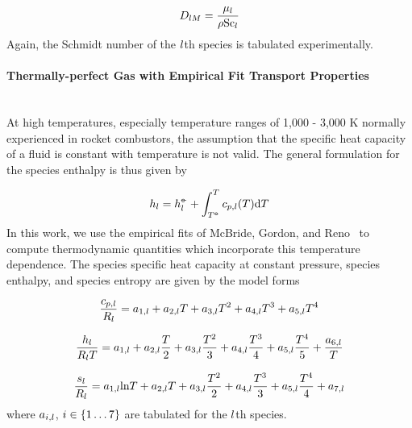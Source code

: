 \begin{equation}\label{eq:cpgMassDiffSpec}
	D_{l M} = \frac{\mu_{l}}{\rho \text{Sc}_{l}}
\end{equation}
Again, the Schmidt number of the $l$th species is tabulated experimentally.

\paragraph*{Thermally-perfect Gas with Empirical Fit Transport Properties}\mbox{}\\

At high temperatures, especially temperature ranges of 1,000 - 3,000 K normally experienced in rocket combustors, the assumption that the specific heat capacity of a fluid is constant with temperature is not valid. The general formulation for the species enthalpy is thus given by

\begin{eqnarray}
	h_{l} = h^{\circ\kern-0.47em-}_{l} + \int_{T^{\circ\kern-0.47em-}}^{T} c_{p,l}(T) \text{d}T
\end{eqnarray}
In this work, we use the empirical fits of McBride, Gordon, and Reno~\cite{McBride1993} to compute thermodynamic quantities which incorporate this temperature dependence. The species specific heat capacity at constant pressure, species enthalpy, and species entropy are given by the model forms

\begin{equation}
	\frac{c_{p,l}}{R_{l}} = a_{1,l} + a_{2,l} T + a_{3,l} T^2 + a_{4,l} T^3 + a_{5,l} T^4
\end{equation}

\begin{equation}
	\frac{h_{l}}{R_{l} T} = a_{1,l} + a_{2,l} \frac{T}{2} + a_{3,l} \frac{T^2}{3} + a_{4,l} \frac{T^3}{4} + a_{5,l} \frac{T^4}{5} + \frac{a_{6,l}}{T}
\end{equation}

\begin{equation}
	\frac{s_{l}}{R_{l}} = a_{1,l} \text{ln}T + a_{2,l} T + a_{3,l} \frac{T^2}{2} + a_{4,l} \frac{T^3}{3} + a_{5,l} \frac{T^4}{4} + a_{7,l}
\end{equation}
where $a_{i,l}$, $i \in \{1 \hdots 7\}$ are tabulated for the $l$th species.

